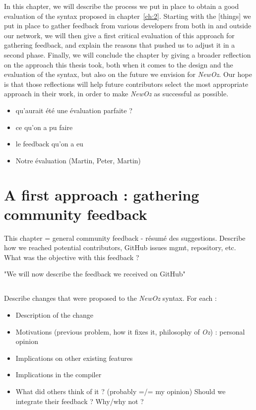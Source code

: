 
In this chapter, we will describe the process we put in place to obtain a good evaluation of the syntax proposed in chapter~\ref{ch:2}.
Starting with the [things] we put in place to gather feedback from various developers  from both in and outside our network,
we will then give a first critical evaluation of this approach for gathering feedback, and explain the reasons that pushed us to adjust it in a second phase.
Finally, we will conclude the chapter by giving a broader reflection on the approach this thesis took, both when it comes to the design and the evaluation of the syntax, but also on the future we envision for \textit{NewOz}.
Our hope is that those reflections will help future contributors select the most appropriate approach in their work, in order to make \textit{NewOz} as successful as possible.
 \begin{itemize}
     \item qu'aurait été une évaluation parfaite ?
     \item ce qu'on a pu faire
     \item le feedback qu'on a eu
     \item Notre évaluation (Martin, Peter, Martin)
 \end{itemize}
\section{A first approach : gathering community feedback}\label{sec:ch4-GitHub}
This chapter = general community feedback - résumé des suggestions.\newline
Describe how we reached potential contributors, GitHub issues mgmt, repository, etc.
What was the objective with this feedback ?

"We will now describe the feedback we received on GitHub"
\subsection{}
Describe changes that were proposed to the \textit{NewOz} syntax.
For each :
\begin{itemize}
    \item Description of the change
    \item Motivations (previous problem, how it fixes it, philosophy of \textit{Oz}) : personal opinion
    \item Implications on other existing features
    \item Implications in the compiler
    \item What did others think of it ? (probably =/= my opinion) Should we integrate their feedback ? Why/why not ?
\end{itemize}

